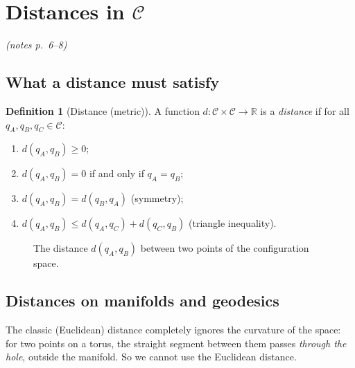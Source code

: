 \documentclass[11pt,a4paper]{article}
\newcommand{\R}{\mathbb{R}}
\newcommand{\C}{\mathcal{C}}
\newcommand{\pts}[1]{\emph{(notes p.~#1)}}
\theoremstyle{definition}
\newtheorem{definition}{Definition}[section]
\theoremstyle{plain}
\begin{document}
\section{Distances in $\C$}\pts{6--8}

\subsection{What a distance must satisfy}

\begin{definition}[Distance (metric)]
A function $d:\C\times\C\to\R$ is a \emph{distance} if for all $q_A,q_B,q_C\in\C$:
\begin{enumerate}[nosep,label=(\roman*)]
  \item $d(q_A,q_B)\ge 0$;
  \item $d(q_A,q_B)=0$ if and only if $q_A=q_B$;
  \item $d(q_A,q_B)=d(q_B,q_A)$ (symmetry);
  \item $d(q_A,q_B)\le d(q_A,q_C)+d(q_C,q_B)$ (triangle inequality).
\end{enumerate}
\end{definition}


\begin{figure}[ht]
\centering
{}
\caption{The distance $d(q_A,q_B)$ between two points of the configuration space.}
\end{figure}

\subsection{Distances on manifolds and geodesics}

The classic (Euclidean) distance completely ignores the curvature of the space: for two points on a torus, the straight segment between them passes \emph{through the hole}, outside the manifold. So we cannot use the Euclidean distance.
\end{document}
